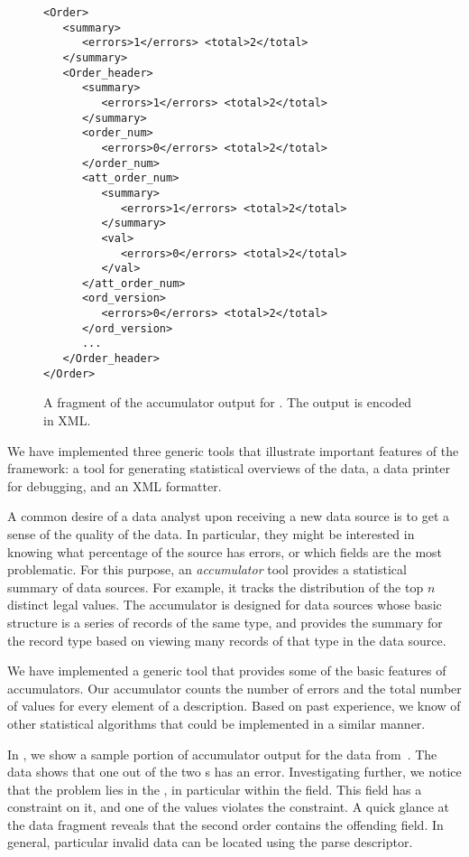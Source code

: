\begin{figure}
  \centering
  \scriptsize
\begin{verbatim}
<Order>
   <summary>
      <errors>1</errors> <total>2</total>        
   </summary>
   <Order_header>
      <summary>
         <errors>1</errors> <total>2</total>        
      </summary>
      <order_num>
         <errors>0</errors> <total>2</total>        
      </order_num>
      <att_order_num>
         <summary>
            <errors>1</errors> <total>2</total>        
         </summary>
         <val>
            <errors>0</errors> <total>2</total>                
         </val>
      </att_order_num>
      <ord_version>
         <errors>0</errors> <total>2</total>                
      </ord_version>
      ...
   </Order_header>
</Order>
\end{verbatim}  
  \caption{A fragment of the accumulator output for \dibbler{}. The
    output is encoded in XML.}
  \label{fig:gentool-acc-output}
\end{figure}

We have implemented three generic tools that illustrate important
features of the framework: a tool for generating statistical
overviews of the data, a data printer for debugging, and an XML
formatter.

A common desire of a data analyst upon receiving a new data source is
to get a sense of the quality of the data. In particular, they might
be interested in knowing what percentage of the source has errors, or
which fields are the most problematic. For this purpose, an
\emph{accumulator} tool provides a statistical summary of data
sources. For example, it tracks the distribution of the top $n$
distinct legal values. The accumulator is designed for data sources
whose basic structure is a series of records of the same type, and
provides the summary for the record type based on viewing many records
of that type in the data source.

We have implemented a generic tool that provides some of the basic
features of accumulators. Our accumulator counts the number of errors
and the total number of values for every element of a description.
Based on past experience, we know of other statistical algorithms that
could be implemented in a similar manner.

In , we show a sample portion of
accumulator output for the \dibbler{} data
from~. The data shows that one out of
the two s has an error. Investigating further, we notice
that the problem lies in the , in particular within
the  field.  This field has a constraint on it, and
one of the values violates the constraint. A quick glance at the data
fragment reveals that the second order contains the offending field.
In general, particular invalid data can be located using the parse
descriptor.

